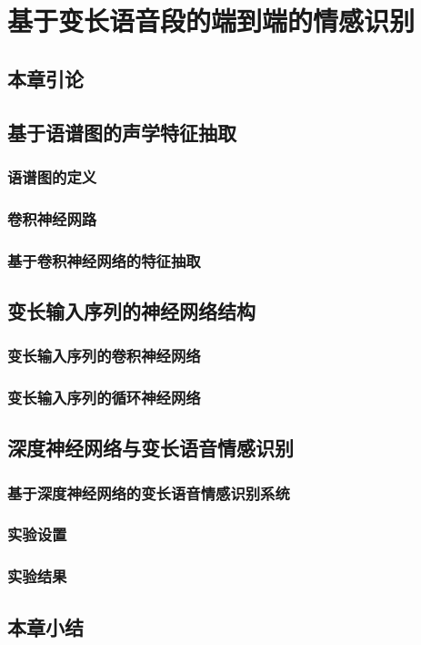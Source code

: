 \chapter{基于变长语音段的端到端的情感识别}

\section{本章引论}

\section{基于语谱图的声学特征抽取}

\subsection{语谱图的定义}

\subsection{卷积神经网路}

\subsection{基于卷积神经网络的特征抽取}

\section{变长输入序列的神经网络结构}

\subsection{变长输入序列的卷积神经网络}

\subsection{变长输入序列的循环神经网络}

\section{深度神经网络与变长语音情感识别}

\subsection{基于深度神经网络的变长语音情感识别系统}

\subsection{实验设置}

\subsection{实验结果}

\section{本章小结}